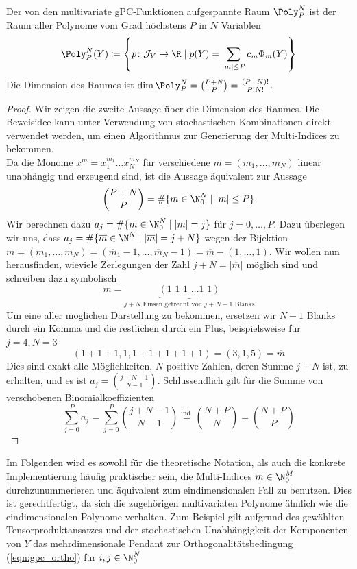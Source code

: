 \begin{mathbem}
Der von den multivariate gPC-Funktionen aufgespannte Raum $\Poly_P^N$ ist der Raum aller Polynome vom Grad höchstens $P$ in $N$ Variablen
\[\Poly_P^N(Y)\coloneqq \left\lbrace p\colon \mathcal{J}_Y\to \R \mid p(Y)=\sum_{|m|\le P}c_m\Phi_m(Y)\right\rbrace\]
Die Dimension des Raumes ist $\dim\Poly_P^N=\binom{P+N}{P}=\frac{(P+N)!}{P!N!}$.
\end{mathbem}
\begin{proof}
Wir zeigen die zweite Aussage über die Dimension des Raumes. Die Beweisidee kann unter Verwendung von stochastischen Kombinationen direkt verwendet werden, um einen Algorithmus zur Generierung der Multi-Indices zu bekommen.\\
Da die Monome $x^m=x_1^{m_1}\dots x_N^{m_N}$ für verschiedene $m=(m_1,\dots,m_N)$ linear unabhängig und erzeugend sind, ist die Aussage äquivalent zur Aussage
\[\binom{P+N}{P}=\#\lbrace m\in\N_0^N \mid |m|\le P\rbrace\] 
Wir berechnen dazu $a_j=\#\lbrace m\in\N_0^N \mid |m|=j\rbrace$ für $j=0,\dots,P$. Dazu überlegen wir uns, dass $a_j=\#\lbrace \overline{m}\in\N^N \mid |\overline{m}|=j+N\rbrace$ wegen der Bijektion $m=(m_1,\dots,m_N)=(\overline{m}_1-1,\dots,\overline{m}_N-1)=\overline{m}-(1,\dots,1)$. Wir wollen nun herausfinden, wieviele Zerlegungen der Zahl $j+N=|\overline{m}|$ möglich sind und schreiben dazu symbolisch
\[\overline{m}=\underbrace{(1\_1\_1\_\dots 1\_1)}_{j+N\text{ Einsen getrennt von } j+N-1 \text{ Blanks}}\]
Um eine aller möglichen Darstellung zu bekommen, ersetzen wir $N-1$ Blanks durch ein Komma und die restlichen durch ein Plus, beispielsweise für $j=4,N=3$
\[(1+1+1,1,1+1+1+1+1)=(3,1,5)=\overline{m}\]
Dies sind exakt alle Möglichkeiten, $N$ positive Zahlen, deren Summe $j+N$ ist, zu erhalten, und es ist $a_j=\binom{j+N-1}{N-1}$.
Schlussendlich gilt für die Summe von verschobenen Binomialkoeffizienten 
\[\sum_{j=0}^Pa_j=\sum_{j=0}^P\binom{j+N-1}{N-1}\stackrel{\text{ind.}}{=}\binom{N+P}{N}=\binom{N+P}{P}\]
\end{proof}
Im Folgenden wird es sowohl für die theoretische Notation, als auch die konkrete Implementierung häufig praktischer sein, die Multi-Indices $m\in\N_0^M$ durchzunummerieren und äquivalent zum eindimensionalen Fall zu benutzen. Dies ist gerechtfertigt, da sich die zugehörigen multivariaten Polynome ähnlich wie die eindimensionalen Polynome verhalten. Zum Beispiel gilt aufgrund des gewählten Tensorproduktansatzes und der stochastischen Unabhängigkeit der Komponenten von $Y$ das mehrdimensionale Pendant zur Orthogonalitätsbedingung (\ref{eqn:gpc_ortho}) für $i,j\in\N_0^N$
